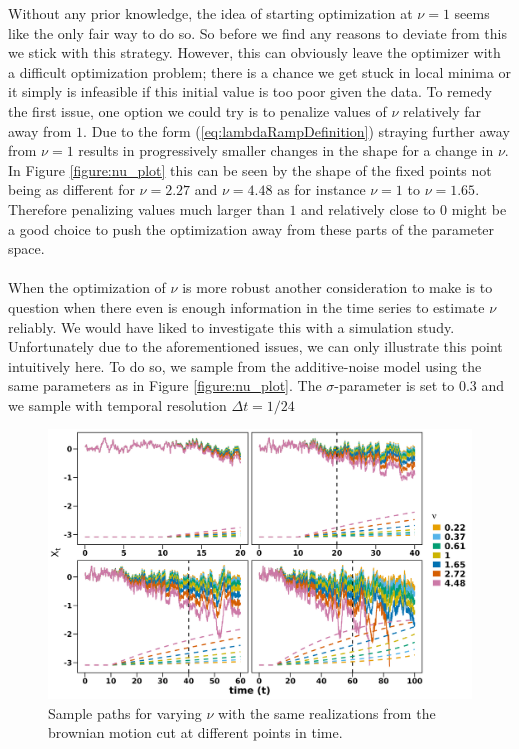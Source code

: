 Without any prior knowledge, the idea of starting optimization at $\nu = 1$ seems like the only fair way to do so. So before we find any reasons to deviate from this we stick with this strategy. However, this can obviously leave the optimizer with a difficult optimization problem; there is a chance we get stuck in local minima or it simply is infeasible if this initial value is too poor given the data. To remedy the first issue, one option we could try is to penalize values of $\nu$ relatively far away from $1$. Due to the form (\ref{eq:lambdaRampDefinition}) straying further away from $\nu = 1$ results in progressively smaller changes in the shape for a change in $\nu$. In Figure \ref{figure:nu_plot} this can be seen by the shape of the fixed points not being as different for $\nu = 2.27$ and $\nu = 4.48$ as for instance $\nu = 1$ to $\nu = 1.65$. Therefore penalizing values much larger than $1$ and relatively close to $0$ might be a good choice to push the optimization away from these parts of the parameter space. \\\\
When the optimization of $\nu$ is more robust another consideration to make is to question when there even is enough information in the time series to estimate $\nu$ reliably. We would have liked to investigate this with a simulation study. Unfortunately due to the aforementioned issues, we can only illustrate this point intuitively here. To do so, we sample from the additive-noise model using the same parameters as in Figure \ref{figure:nu_plot}. The $\sigma$-parameter is set to $0.3$ and we sample with temporal resolution $\Delta t = 1/24$
\begin{figure}[h!]
    \begin{center}
    \includegraphics[scale = .13]{figures/mu_simulations_discussion_plot.jpeg}
    \caption{Sample paths for varying $\nu$ with the same realizations from the brownian motion cut at different points in time.}
    \label{figure:mu_simulations_discussion_plot}
    \end{center}
\end{figure}\\
